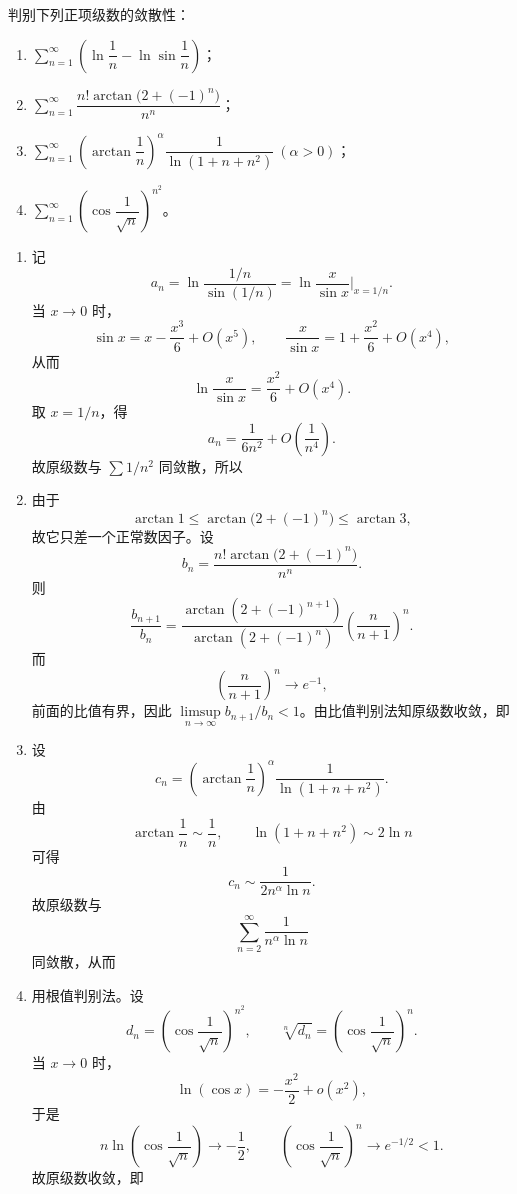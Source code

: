 ﻿

\begin{question}[正项级数的敛散性]

判别下列正项级数的敛散性：
\begin{enumerate}[label=(\arabic*),leftmargin=2.6em,itemsep=0.25em,topsep=0.2em]
\item $\sum_{n=1}^{\infty}\left(\ln \dfrac{1}{n}-\ln \sin \dfrac{1}{n}\right)$；
\item $\sum_{n=1}^{\infty}\dfrac{n!\arctan\!\bigl(2+(-1)^n\bigr)}{n^n}$；
\item $\sum_{n=1}^{\infty}\left(\arctan\dfrac{1}{n}\right)^\alpha\dfrac{1}{\ln(1+n+n^2)}\ (\alpha>0)$；
\item $\sum_{n=1}^{\infty}\left(\cos\dfrac{1}{\sqrt n}\right)^{n^2}$。
\end{enumerate}

\begin{solution}
\begin{enumerate}[label=(\arabic*),leftmargin=2.6em,itemsep=0.25em,topsep=0.2em]
\item 记
\[
a_n=\ln\frac{1/n}{\sin(1/n)}=\ln\frac{x}{\sin x}\Big|_{x=1/n}.
\]
当 $x\to0$ 时，
\[
\sin x=x-\frac{x^3}{6}+O(x^5),
\qquad
\frac{x}{\sin x}=1+\frac{x^2}{6}+O(x^4),
\]
从而
\[
\ln\frac{x}{\sin x}=\frac{x^2}{6}+O(x^4).
\]
取 $x=1/n$，得
\[
a_n=\frac{1}{6n^2}+O\!\left(\frac{1}{n^4}\right).
\]
故原级数与 $\sum 1/n^2$ 同敛散，所以

\item 由于
\[
\arctan 1\le \arctan\!\bigl(2+(-1)^n\bigr)\le \arctan 3,
\]
故它只差一个正常数因子。设
\[
b_n=\frac{n!\arctan\!\bigl(2+(-1)^n\bigr)}{n^n}.
\]
则
\[
\frac{b_{n+1}}{b_n}
=\frac{\arctan(2+(-1)^{n+1})}{\arctan(2+(-1)^n)}
\left(\frac{n}{n+1}\right)^n.
\]
而
\[
\left(\frac{n}{n+1}\right)^n\to e^{-1},
\]
前面的比值有界，因此 $\limsup\limits_{n\to\infty} b_{n+1}/b_n<1$。由比值判别法知原级数收敛，即

\item 设
\[
c_n=\left(\arctan\frac1n\right)^\alpha\frac{1}{\ln(1+n+n^2)}.
\]
由
\[
\arctan\frac1n\sim \frac1n,
\qquad
\ln(1+n+n^2)\sim 2\ln n
\]
可得
\[
c_n\sim \frac{1}{2n^\alpha\ln n}.
\]
故原级数与
\[
\sum_{n=2}^{\infty}\frac{1}{n^\alpha\ln n}
\]
同敛散，从而

\item 用根值判别法。设
\[
d_n=\left(\cos\frac{1}{\sqrt n}\right)^{n^2},
\qquad
\sqrt[n]{d_n}=\left(\cos\frac{1}{\sqrt n}\right)^n.
\]
当 $x\to0$ 时，
\[
\ln(\cos x)=-\frac{x^2}{2}+o(x^2),
\]
于是
\[
n\ln\!\left(\cos\frac{1}{\sqrt n}\right)\to -\frac12,
\qquad
\left(\cos\frac{1}{\sqrt n}\right)^n\to e^{-1/2}<1.
\]
故原级数收敛，即
\end{enumerate}
\end{solution}
\end{question}

